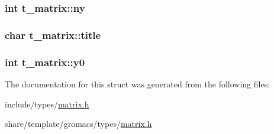 \hypertarget{structt__matrix_a4d35a3da552693f1ee7fdfef594c4205}{
\subsubsection[{ny}]{\setlength{\rightskip}{0pt plus 5cm}int {\bf t\-\_\-matrix\-::ny}}}\label{structt__matrix_a4d35a3da552693f1ee7fdfef594c4205}
\hypertarget{structt__matrix_a2804ac69c08383f0e8aa548bab73a1d5}{
\subsubsection[{title}]{\setlength{\rightskip}{0pt plus 5cm}char {\bf t\-\_\-matrix\-::title}}}\label{structt__matrix_a2804ac69c08383f0e8aa548bab73a1d5}
\hypertarget{structt__matrix_a2aa97901a5cd73b954f861da0e27aa5a}{
\subsubsection[{y0}]{\setlength{\rightskip}{0pt plus 5cm}int {\bf t\-\_\-matrix\-::y0}}}\label{structt__matrix_a2aa97901a5cd73b954f861da0e27aa5a}


\-The documentation for this struct was generated from the following files\-:\begin{DoxyCompactItemize}
\item 
include/types/\hyperlink{include_2types_2matrix_8h}{matrix.\-h}\item 
share/template/gromacs/types/\hyperlink{share_2template_2gromacs_2types_2matrix_8h}{matrix.\-h}\end{DoxyCompactItemize}

